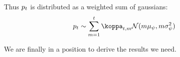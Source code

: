 \documentclass[\econtexRoot/BufferStockTheory.tex]{subfiles}
\begin{document}
Thus $p_{t}$ is distributed as a weighted sum of gaussians:
\begin{equation}\begin{gathered}\begin{aligned}
  \pLog_{\FutPer} & \sim \sum_{\LooPer=1}^{\FutPer}\wgt_{\FutPer,\LooPer}\mathcal{N}(\LooPer \pShkMean,\LooPer \sigma^{2}_{\DnsShk})
\end{aligned}\end{gathered}\end{equation}

We are finally in a position to derive the results we need.
\end{document}
